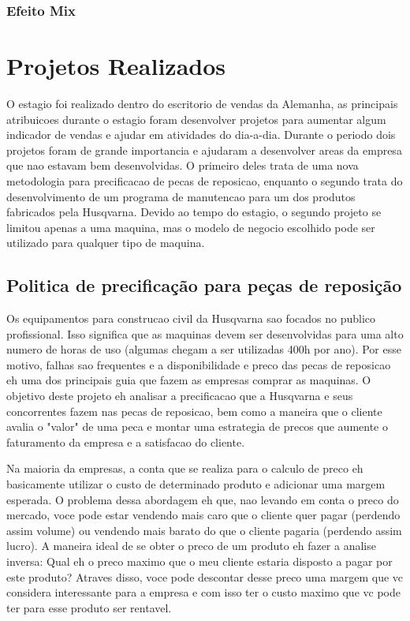 \documentclass[12pt]{article}
\begin{document}
\subsubsection{Efeito Mix}

\section{Projetos Realizados}

	O estagio foi realizado dentro do escritorio de vendas da Alemanha, as principais atribuicoes durante o estagio foram desenvolver projetos para aumentar algum indicador de vendas e ajudar em atividades do dia-a-dia.  Durante o periodo dois projetos foram de grande importancia e ajudaram a desenvolver areas da empresa que nao estavam bem desenvolvidas. O primeiro deles trata de uma nova metodologia para precificacao de pecas de reposicao, enquanto o segundo trata do desenvolvimento de um programa de manutencao para um dos produtos fabricados pela Husqvarna. Devido ao tempo do estagio, o segundo projeto se limitou apenas a uma maquina, mas o modelo de negocio escolhido pode ser utilizado para qualquer tipo de maquina.

\subsection{Politica de precificação para peças de reposição}

	Os equipamentos para construcao civil da Husqvarna sao focados no publico profissional. Isso significa que as maquinas devem ser desenvolvidas para uma alto numero de horas de uso (algumas chegam a ser utilizadas 400h por ano). Por esse motivo, falhas sao frequentes e a disponibilidade e preco das pecas de reposicao eh uma dos principais guia que fazem as empresas comprar as maquinas. O objetivo deste projeto eh analisar a precificacao que a Husqvarna e seus concorrentes fazem nas pecas de reposicao, bem como a maneira que o cliente avalia o "valor" de uma peca e montar uma estrategia de precos que aumente o faturamento da empresa e a satisfacao do cliente.

	Na maioria da empresas, a conta que se realiza para o calculo de preco eh basicamente utilizar o custo de determinado produto e adicionar uma margem esperada. O problema dessa abordagem eh que, nao levando em conta o preco do mercado, voce pode estar vendendo mais caro que o cliente quer pagar (perdendo assim volume) ou vendendo mais barato do que o cliente pagaria (perdendo assim lucro). A maneira ideal de se obter o preco de um produto eh fazer a analise inversa: Qual eh o preco maximo que o meu cliente estaria disposto a pagar por este produto? Atraves disso, voce pode descontar desse preco uma margem que vc considera interessante para a empresa e com isso ter o custo maximo que vc pode ter para esse produto ser rentavel.
\end{document}
